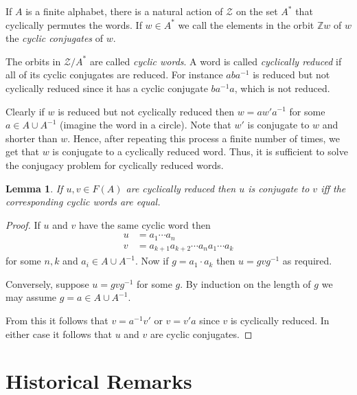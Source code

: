 \documentclass{report}
\theoremstyle{definition}
\theoremstyle{plain}
\newtheorem{lem}[thm]{Lemma}
\theoremstyle{definition}
\begin{document}
	If $A$ is a finite alphabet, there is a natural action of $\mathcal{Z}$ on the set $A^*$ that cyclically permutes the words. If $w\in A^*$ we call the elements in the orbit $\mathbb{Z}w$ of $w$ the \emph{cyclic conjugates} of $w$. 
	
	The orbits in $\mathcal{Z}/A^*$ are called \emph{cyclic words}. A word is called \emph{cyclically reduced} if all of its cyclic conjugates are reduced.  For instance $aba^{-1}$ is reduced but not cyclically reduced since it has a cyclic conjugate $ba^{-1}a$, which is not reduced.
	
	Clearly if $w$ is reduced but not cyclically reduced then $w = aw'a^{-1}$ for some $a\in A\cup A^{-1}$ (imagine the word in a circle). Note that $w'$ is conjugate to $w$ and shorter than $w$. Hence, after repeating this process a finite number of times, we get that $w$ is conjugate to a cyclically reduced word. Thus, it is sufficient to solve the conjugacy problem for cyclically reduced words.
	
	\begin{lem}
		If $u,v\in F(A)$ are cyclically reduced then $u$ is conjugate to $v$ iff the corresponding cyclic words are equal.
	\end{lem}
	\begin{proof}
		If $u$ and $v$ have the same cyclic word then
		\begin{align*}
			u &= a_1\cdots a_n\\
			v &= a_{k+1} a_{k+2} \cdots a_n a_1 \cdots a_k
		\end{align*}
		for some $n,k$ and $a_i\in A\cup A^{-1}$. Now if $g = a_1\cdot a_k$ then $u = gvg^{-1}$ as required.
		
		Conversely, suppose $u=gvg^{-1}$ for some $g$. By induction on the length of $g$ we may assume $g=a\in A\cup A^{-1}$.
		
		From this it follows that $v = a^{-1}v'$ or $v=v'a$ since $v$ is cyclically reduced. In either case it follows that $u$ and $v$ are cyclic conjugates. 
	\end{proof}
	\section{Historical Remarks}
\end{document}
